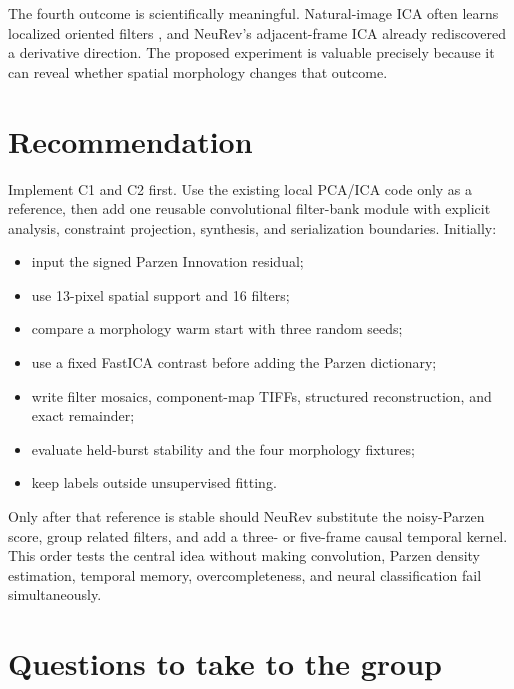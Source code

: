 \documentclass[11pt]{article}
\begin{document}
The fourth outcome is scientifically meaningful. Natural-image ICA often
learns localized oriented filters \cite{bellsejnowski1997edges}, and NeuRev's
adjacent-frame ICA already rediscovered a derivative direction. The proposed
experiment is valuable precisely because it can reveal whether spatial
morphology changes that outcome.

\section{Recommendation}

Implement C1 and C2 first. Use the existing local PCA/ICA code only as a
reference, then add one reusable convolutional filter-bank module with explicit
analysis, constraint projection, synthesis, and serialization boundaries.
Initially:
\begin{itemize}[leftmargin=*]
\item input the signed Parzen Innovation residual;
\item use 13-pixel spatial support and 16 filters;
\item compare a morphology warm start with three random seeds;
\item use a fixed FastICA contrast before adding the Parzen dictionary;
\item write filter mosaics, component-map TIFFs, structured reconstruction,
and exact remainder;
\item evaluate held-burst stability and the four morphology fixtures;
\item keep labels outside unsupervised fitting.
\end{itemize}

Only after that reference is stable should NeuRev substitute the noisy-Parzen
score, group related filters, and add a three- or five-frame causal temporal
kernel. This order tests the central idea without making convolution, Parzen
density estimation, temporal memory, overcompleteness, and neural
classification fail simultaneously.

\section{Questions to take to the group}
\end{document}
